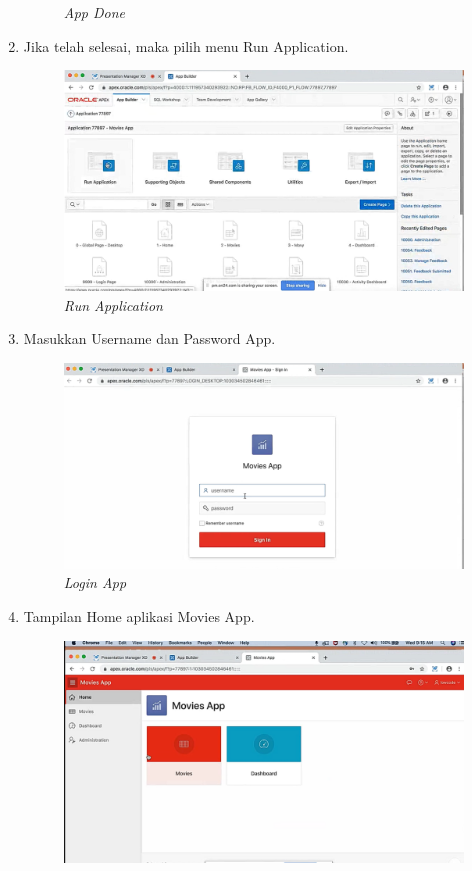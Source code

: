 \begin{enumerate}
\begin{figure}[H]
    \caption{\textit{App Done}}
    \label{AppDone}
\end{figure}
\item Jika telah selesai, maka pilih menu Run Application.
 \begin{figure}[H]
    \centering
    \includegraphics[scale=0.5]{figures/19}
    \caption{\textit{Run Application}}
    \label{RunApp}
\end{figure}
\item Masukkan Username dan Password App.
 \begin{figure}[H]
    \centering
    \includegraphics[scale=0.5]{figures/20}
    \caption{\textit{Login App}}
    \label{LoginApp}
\end{figure}
\item Tampilan Home aplikasi Movies App.
 \begin{figure}[H]
    \centering
    \includegraphics[scale=0.5]{figures/21}

\end{figure}
\end{enumerate}
